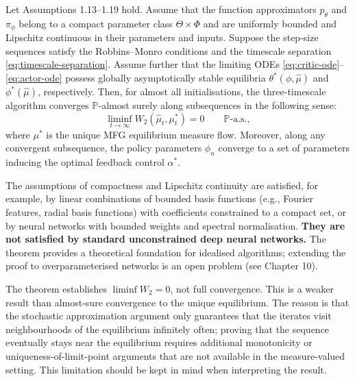 \begin{theorem}
\label{thm:rl-subsequential}
Let Assumptions 1.13--1.19 hold. Assume that the function approximators $p_\theta$
and $\pi_\phi$ belong to a compact parameter class $\Theta \times \Phi$ and are
uniformly bounded and Lipschitz continuous in their parameters and inputs. Suppose
the step-size sequences satisfy the Robbins--Monro conditions and the timescale
separation \eqref{eq:timescale-separation}. Assume further that the limiting ODEs
\eqref{eq:critic-ode}--\eqref{eq:actor-ode} possess globally asymptotically stable
equilibria $\theta^*(\phi,\hat\mu)$ and $\phi^*(\hat\mu)$, respectively. Then, for
almost all initialisations, the three-timescale algorithm converges
$\mathbb{P}$-almost surely along subsequences in the following sense:
\[
    \liminf_{t \to \infty} W_2(\hat\mu_t, \mu_t^*) = 0 \qquad \mathbb{P}\text{-a.s.},
\]
where $\mu^*$ is the unique MFG equilibrium measure flow. Moreover, along any
convergent subsequence, the policy parameters $\phi_n$ converge to a set of
parameters inducing the optimal feedback control $\alpha^*$.
\end{theorem}

\begin{remark}
The assumptions of compactness and Lipschitz continuity are satisfied, for example, by
linear combinations of bounded basis functions (e.g., Fourier features, radial basis
functions) with coefficients constrained to a compact set, or by neural networks with
bounded weights and spectral normalisation. \textbf{They are not satisfied by
standard unconstrained deep neural networks.} The theorem provides a theoretical
foundation for idealised algorithms; extending the proof to overparameterised
networks is an open problem (see Chapter 10).
\end{remark}

\begin{remark}
The theorem establishes $\liminf W_2 = 0$, not full convergence. This is a weaker
result than almost-sure convergence to the unique equilibrium. The reason is that the
stochastic approximation argument only guarantees that the iterates visit
neighbourhoods of the equilibrium infinitely often; proving that the sequence
eventually stays near the equilibrium requires additional monotonicity or
uniqueness-of-limit-point arguments that are not available in the measure-valued
setting. This limitation should be kept in mind when interpreting the result.
\end{remark}

